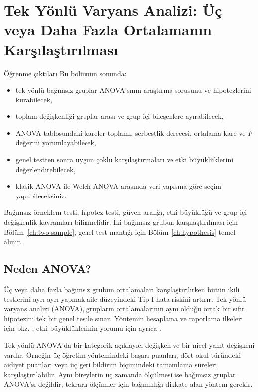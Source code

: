 \chapter{Tek Yönlü Varyans Analizi: Üç veya Daha Fazla Ortalamanın Karşılaştırılması}
\label{ch:anova}

\begin{prismbox}[PrismLight]{Öğrenme çıktıları}
Bu bölümün sonunda:
\begin{itemize}
  \item tek yönlü bağımsız gruplar ANOVA'sının araştırma sorusunu ve hipotezlerini kurabilecek,
  \item toplam değişkenliği gruplar arası ve grup içi bileşenlere ayırabilecek,
  \item ANOVA tablosundaki kareler toplamı, serbestlik derecesi, ortalama kare ve $F$ değerini yorumlayabilecek,
  \item genel testten sonra uygun çoklu karşılaştırmaları ve etki büyüklüklerini değerlendirebilecek,
  \item klasik ANOVA ile Welch ANOVA arasında veri yapısına göre seçim yapabileceksiniz.
\end{itemize}
\end{prismbox}

\begin{prerequisitebox}
Bağımsız örneklem \tstat testi, hipotez testi, güven aralığı, etki büyüklüğü
ve grup içi değişkenlik kavramları bilinmelidir. İki bağımsız grubun
karşılaştırılması için Bölüm~\ref{ch:two-sample}, genel test mantığı için
Bölüm~\ref{ch:hypothesis} temel alınır.
\end{prerequisitebox}

\section{Neden ANOVA?}

Üç veya daha fazla bağımsız grubun ortalamaları karşılaştırılırken bütün
ikili \tstat testlerini ayrı ayrı yapmak aile düzeyindeki Tip I hata riskini
artırır. Tek yönlü varyans analizi (ANOVA), grupların ortalamalarının aynı
olduğu ortak bir sıfır hipotezini tek bir genel testle sınar. Yöntemin
hesaplama ve raporlama ilkeleri için bkz. \citet{agresti2018}; etki
büyüklüklerinin yorumu için ayrıca \citet{lakens2013}.

Tek yönlü ANOVA'da bir kategorik açıklayıcı değişken ve bir nicel yanıt
değişkeni vardır. Örneğin üç öğretim yöntemindeki başarı puanları, dört okul
türündeki aidiyet puanları veya üç geri bildirim biçimindeki tamamlama süreleri
karşılaştırılabilir. Aynı bireylerin üç zamanda ölçülmesi ise bağımsız gruplar
ANOVA'sı değildir; tekrarlı ölçümler için bağımlılığı dikkate alan yöntem gerekir.

